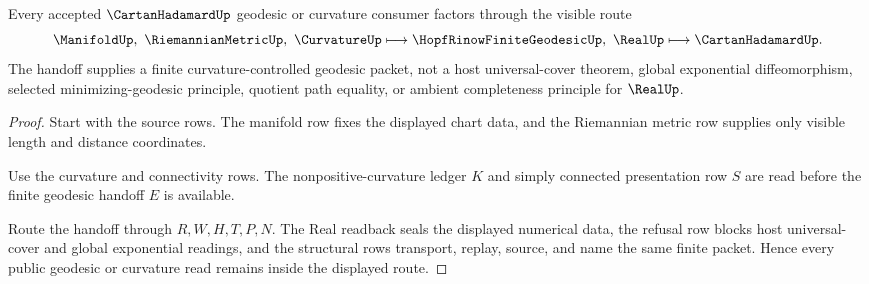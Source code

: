 \begin{theorem}
\label{thm:cartan-hadamard-geodesic-boundary}
Every accepted $\CartanHadamardUp$ geodesic or curvature consumer factors through the visible route
$$
\ManifoldUp,\ \RiemannianMetricUp,\ \CurvatureUp
\longmapsto
\HopfRinowFiniteGeodesicUp,\ \RealUp
\longmapsto
\CartanHadamardUp .
$$
The handoff supplies a finite curvature-controlled geodesic packet, not a host universal-cover theorem, global exponential diffeomorphism, selected minimizing-geodesic principle, quotient path equality, or ambient completeness principle for $\RealUp$.
\end{theorem}
\begin{proof}
Start with the source rows. The manifold row fixes the displayed chart data, and the Riemannian metric row supplies only visible length and distance coordinates.

Use the curvature and connectivity rows. The nonpositive-curvature ledger $K$ and simply connected presentation row $S$ are read before the finite geodesic handoff $E$ is available.

Route the handoff through $R,W,H,T,P,N$. The Real readback seals the displayed numerical data, the refusal row blocks host universal-cover and global exponential readings, and the structural rows transport, replay, source, and name the same finite packet. Hence every public geodesic or curvature read remains inside the displayed route.
\end{proof}





